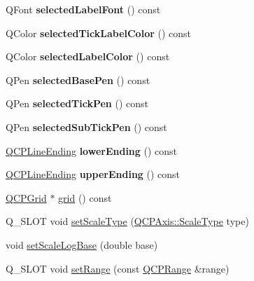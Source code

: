 \begin{DoxyCompactItemize}
Q\+Font {\bfseries selected\+Label\+Font} () const
\item 
\mbox{\label{class_q_c_p_axis_a75f11d3031a11559f3e984e916fcde2c}} 
Q\+Color {\bfseries selected\+Tick\+Label\+Color} () const
\item 
\mbox{\label{class_q_c_p_axis_a7adea64ef4b715e7a1c519fff2b110b8}} 
Q\+Color {\bfseries selected\+Label\+Color} () const
\item 
\mbox{\label{class_q_c_p_axis_a0d54314ab3053fd0fb77294a0e7f08cb}} 
Q\+Pen {\bfseries selected\+Base\+Pen} () const
\item 
\mbox{\label{class_q_c_p_axis_a76b52a6d824ccf9a95eb024251e1b833}} 
Q\+Pen {\bfseries selected\+Tick\+Pen} () const
\item 
\mbox{\label{class_q_c_p_axis_a73c147bb2c5598edbb842adc2da8a7bf}} 
Q\+Pen {\bfseries selected\+Sub\+Tick\+Pen} () const
\item 
\mbox{\label{class_q_c_p_axis_a0cc60e5694ed4df6a2c3554e53ee6ae7}} 
\mbox{\hyperlink{class_q_c_p_line_ending}{Q\+C\+P\+Line\+Ending}} {\bfseries lower\+Ending} () const
\item 
\mbox{\label{class_q_c_p_axis_a9feaf5f78286693e89221bc205f9389a}} 
\mbox{\hyperlink{class_q_c_p_line_ending}{Q\+C\+P\+Line\+Ending}} {\bfseries upper\+Ending} () const
\item 
\mbox{\hyperlink{class_q_c_p_grid}{Q\+C\+P\+Grid}} $\ast$ \mbox{\hyperlink{class_q_c_p_axis_a63f1dd2df663680d2a8d06c19592dd63}{grid}} () const
\item 
Q\+\_\+\+S\+L\+OT void \mbox{\hyperlink{class_q_c_p_axis_adef29cae617af4f519f6c40d1a866ca6}{set\+Scale\+Type}} (\mbox{\hyperlink{class_q_c_p_axis_a36d8e8658dbaa179bf2aeb973db2d6f0}{Q\+C\+P\+Axis\+::\+Scale\+Type}} type)
\item 
void \mbox{\hyperlink{class_q_c_p_axis_a726186054be90487885a748aa1b42188}{set\+Scale\+Log\+Base}} (double base)
\item 
Q\+\_\+\+S\+L\+OT void \mbox{\hyperlink{class_q_c_p_axis_aebdfea5d44c3a0ad2b4700cd4d25b641}{set\+Range}} (const \mbox{\hyperlink{class_q_c_p_range}{Q\+C\+P\+Range}} \&range)
\item 

\end{DoxyCompactItemize}
